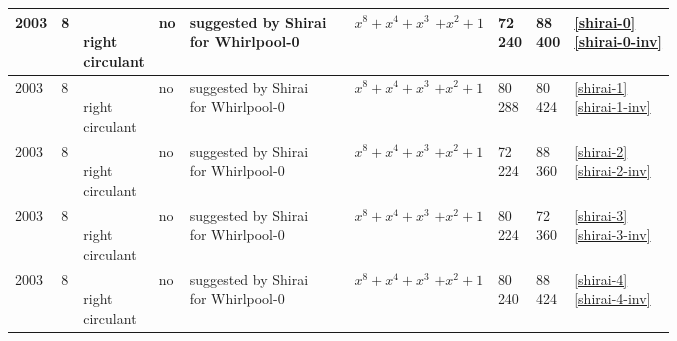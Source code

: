 \begin{footnotesize}
\begin{longtable}[c]{|l|l|l|l|l|l|l|l|l|l|}
2003 & 8 & \shortstack{\\ right \\ circulant} & no & \shortstack{suggested by Shirai \\ for Whirlpool-0} & \cite{Shirai2003} & \shortstack{$x^8+x^4+x^3$\\$+x^2+1$} & \shortstack{72\\240} & \shortstack{88\\400} & \shortstack{\eqref{shirai-0}\\\eqref{shirai-0-inv}} \\ \hline
2003 & 8 & \shortstack{\\ right \\ circulant} & no & \shortstack{suggested by Shirai \\ for Whirlpool-0} & \cite{Shirai2003} & \shortstack{$x^8+x^4+x^3$\\$+x^2+1$} & \shortstack{80\\288} & \shortstack{80\\424} & \shortstack{\eqref{shirai-1}\\\eqref{shirai-1-inv}} \\ \hline
2003 & 8 & \shortstack{\\ right \\ circulant} & no & \shortstack{suggested by Shirai \\ for Whirlpool-0} & \cite{Shirai2003} & \shortstack{$x^8+x^4+x^3$\\$+x^2+1$} & \shortstack{72\\224} & \shortstack{88\\360} & \shortstack{\eqref{shirai-2}\\\eqref{shirai-2-inv}} \\ \hline
2003 & 8 & \shortstack{\\ right \\ circulant} & no & \shortstack{suggested by Shirai \\ for Whirlpool-0} & \cite{Shirai2003} & \shortstack{$x^8+x^4+x^3$\\$+x^2+1$} & \shortstack{80\\224} & \shortstack{72\\360} & \shortstack{\eqref{shirai-3}\\\eqref{shirai-3-inv}} \\ \hline
2003 & 8 & \shortstack{\\ right \\ circulant} & no & \shortstack{suggested by Shirai \\ for Whirlpool-0} & \cite{Shirai2003} & \shortstack{$x^8+x^4+x^3$\\$+x^2+1$} & \shortstack{80\\240} & \shortstack{88\\424} & \shortstack{\eqref{shirai-4}\\\eqref{shirai-4-inv}} \\ \hline

\end{longtable}
\end{footnotesize}
